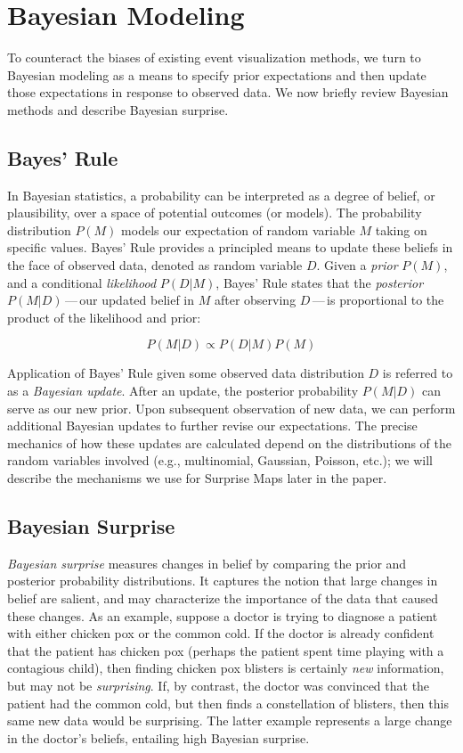 \documentclass[journal]{vgtc}                %
\begin{document}
\section{Bayesian Modeling}
\label{sec:surprise}

To counteract the biases of existing event visualization methods, we turn to Bayesian modeling as a means to specify prior expectations and then update those expectations in response to observed data. We now briefly review Bayesian methods and describe Bayesian surprise.

\subsection{Bayes' Rule}

In Bayesian statistics, a probability can be interpreted as a degree of belief, or plausibility, over a space of potential outcomes (or models). The probability distribution $P(M)$ models our expectation of random variable $M$ taking on specific values. Bayes' Rule provides a principled means to update these beliefs in the face of observed data, denoted as random variable $D$.
Given a \emph{prior} $P(M)$, and a conditional \emph{likelihood} $P(D|M)$, Bayes' Rule states that the \emph{posterior} $P(M|D)$\,---\,our updated belief in $M$ after observing $D$\,---\,is proportional to the product of the likelihood and prior:

$$ P(M|D) \propto P(D|M) P(M) $$

Application of Bayes' Rule given some observed data distribution $D$ is referred to as a \emph{Bayesian update}. After an update, the posterior probability $P(M|D)$ can serve as our new prior. Upon subsequent observation of new data, we can perform additional Bayesian updates to further revise our expectations. The precise mechanics of how these updates are calculated depend on the distributions of the random variables involved (e.g., multinomial, Gaussian, Poisson, etc.); we will describe the mechanisms we use for Surprise Maps later in the paper.

\subsection{Bayesian Surprise}

\emph{Bayesian surprise} measures changes in belief by comparing the prior and posterior probability distributions. It captures the notion that large changes in belief are salient, and may characterize the importance of the data that caused these changes. As an example, suppose a doctor is trying to diagnose a patient with either chicken pox or the common cold. If the doctor is already confident that the patient has chicken pox (perhaps the patient spent time playing with a contagious child), then finding chicken pox blisters is certainly \emph{new} information, but may not be \emph{surprising}. If, by contrast, the doctor was convinced that the patient had the common cold, but then finds a constellation of blisters, then this same new data would be surprising. The latter example represents a large change in the doctor's beliefs, entailing high Bayesian surprise.
\end{document}
